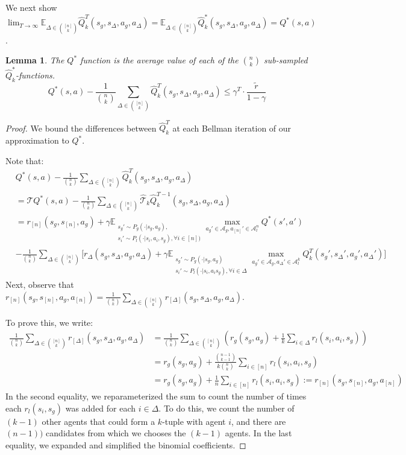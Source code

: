 \documentclass{article}
\theoremstyle{plain}
\newtheorem{lemma}[theorem]{Lemma}
\theoremstyle{definition}
\def\E{\mathbb{E}}
\begin{document}
We next show $\lim_{T\to\infty}\E_{\Delta\in{[n]\choose k}}\hat{Q}_k^T(s_g,s_\Delta,a_g,a_\Delta) = \E_{\Delta\in{[n]\choose k}}\hat{Q}_k^*(s_g,s_\Delta,a_g,a_\Delta) = Q^*(s,a)$. 

\begin{lemma}The $Q^*$ function is the average value of each of the ${n\choose k}$ sub-sampled $\hat{Q}^*_k$-functions. \label{framework:compare}
    \[Q^*(s,a) - \frac{1}{{n\choose k}}\sum_{\Delta\in{[n]\choose k}}\hat{Q}_k^{T}(s_g,s_\Delta,a_g,a_\Delta) \leq \gamma^T \cdot \frac{\tilde{r}}{1-\gamma}\]
\end{lemma}
\begin{proof}
We bound the differences between $\hat{Q}_k^T$ at each Bellman iteration of our approximation to $Q^*$. 

Note that:
\begin{align*}
    &Q^*(s,a) - \frac{1}{{n\choose k}}\sum_{\Delta \in {[n]\choose k}}\hat{Q}_k^T(s_g,s_{\Delta},a_g,a_\Delta) 
    \\
    &= \mathcal{T}Q^*(s,a) - \frac{1}{{n\choose k}}\sum_{\Delta \in {[n]\choose k}}\hat{\mathcal{T}}_k\hat{Q}_k^{T-1}(s_g,s_{\Delta},a_g,a_\Delta) \\ 
    &=  r_{[n]}(s_g,s_{[n]},a_g) + \gamma 
    \E_{\substack{s_g'\sim P_g(\cdot|s_g,a_g),\\ s_i'\sim P_l(\cdot|s_i,a_i,s_g),\forall i\in[n])}}
    \max_{a_g'\in \mathcal{A}_g,a_{[n]}'\in\mathcal{A}_l^n} Q^*(s',a') \\
    & - \frac{1}{{n\choose k}}\sum_{\Delta\in {[n]\choose k}} \bigg[r_{\Delta}(s_g,s_\Delta,a_g,a_\Delta) + \gamma \E_{\substack{s_g'\sim{P}_g(\cdot|s_g,a_g)\\s_i'\sim {P}_l(\cdot|s_i,a_is_g), \forall i\in\Delta}}\max_{a_g'\in \mathcal{A}_g,a_\Delta'\in\mathcal{A}_l^k} Q_k^T(s_g', s_\Delta',a_g',a_\Delta')\bigg]
\end{align*}
Next, observe that $r_{[n]}(s_g,s_{[n]}, a_g,a_{[n]}) = \frac{1}{{n\choose k}}\sum_{\Delta\in {[n]\choose k}} r_{[\Delta]}(s_g,s_\Delta,a_g,a_\Delta)$. 

To prove this, we write:
\begin{align*}
    \frac{1}{{n\choose k}}\sum_{\Delta\in {[n]\choose k}} r_{[\Delta]}(s_g,s_\Delta,a_g,a_\Delta) &= \frac{1}{{n\choose k}}\sum_{\Delta\in {[n]\choose k}} (r_g(s_g,a_g)+ \frac{1}{k} \sum_{i\in\Delta}r_l(s_i, a_i, s_g)) \\
    &= r_g(s_g,a_g) + \frac{{n-1 \choose k-1}}{k{n\choose k}}\sum_{i\in[n]} r_l(s_i,a_i,s_g) \\
    &= r_g(s_g,a_g) + \frac{1}{n}\sum_{i\in[n]}r_l(s_i, a_i, s_g) := r_{[n]}(s_g, s_{[n]}, a_g,a_{[n]})
\end{align*}
In the second equality, we reparameterized the sum to count the number of times each $r_l(s_i, s_g)$ was added for each $i\in\Delta$. To do this, we count the number of $(k-1)$ other agents that could form a $k$-tuple with agent $i$, and there are $(n-1))$ candidates from which we chooses the $(k-1)$ agents. In the last equality, we expanded and simplified the binomial coefficients. 


\end{proof}
\end{document}
